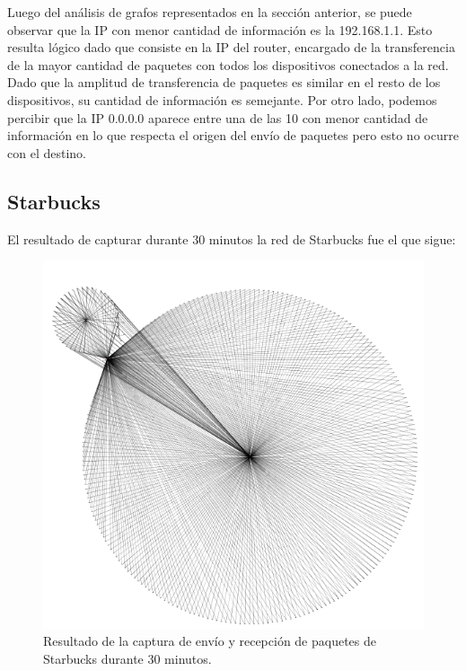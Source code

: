 \documentclass[10pt, a4paper]{article}
\begin{document}
Luego del análisis de grafos representados en la sección anterior, se puede observar que la IP con menor cantidad de información es la 192.168.1.1. Esto resulta lógico dado que consiste en la IP del router, encargado de la transferencia de la mayor cantidad de paquetes con todos los dispositivos conectados a la red. Dado que la amplitud de transferencia de paquetes es similar en el resto de los dispositivos, su cantidad de información es semejante.
Por otro lado, podemos percibir que la IP 0.0.0.0 aparece entre una de las 10 con menor cantidad de información en lo que respecta el origen del envío de paquetes pero esto no ocurre con el destino.

\newpage
\subsection{Starbucks}

 El resultado de capturar durante 30 minutos la red de Starbucks fue el que sigue:

\begin{figure}[H] %
\begin{center}
\includegraphics[width=450pt]{../imgs/starbucks30_entero.png}
\caption{Resultado de la captura de envío y recepción de paquetes de Starbucks durante 30 minutos.}
\end{center}
\end{figure}
\end{document}
